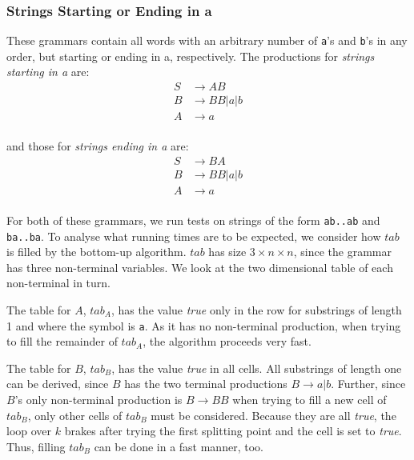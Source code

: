 \subsubsection{Strings Starting or Ending in a}
These grammars contain all words with an arbitrary number of \texttt{a}'s and \texttt{b}'s in any order, but starting or ending in a, respectively.
The productions for \textit{strings starting in a} are:
\begin{align*}
    S&\rightarrow AB\\
    B&\rightarrow BB|a|b\\
    A&\rightarrow a\\
\end{align*}

and those for \textit{strings ending in a} are:
\begin{align*}
    S&\rightarrow BA\\
    B&\rightarrow BB|a|b\\
    A&\rightarrow a\\
\end{align*}

For both of these grammars, we run tests on strings of the form \texttt{ab..ab} and \texttt{ba..ba}.
To analyse what running times are to be expected, we consider how $tab$ is filled by the bottom-up algorithm.
$tab$ has size $3\times n\times n$, since the grammar has three non-terminal variables.
We look at the two dimensional table of each non-terminal in turn.

The table for $A$, $tab_A$, has the value \textit{true} only in the row for substrings of length 1 and where the symbol is \texttt{a}.
As it has no non-terminal production, when trying to fill the remainder of $tab_A$, the algorithm proceeds very fast.

The table for $B$, $tab_B$, has the value \textit{true} in all cells.
All substrings of length one can be derived, since $B$ has the two terminal productions $B\rightarrow a|b$.
Further, since $B$'s only non-terminal production is $B\rightarrow BB$ when trying to fill a new cell of $tab_B$, only other cells of $tab_B$ must be considered.
Because they are all \textit{true}, the loop over $k$ brakes after trying the first splitting point and the cell is set to \textit{true}.
Thus, filling $tab_B$ can be done in a fast manner, too.

